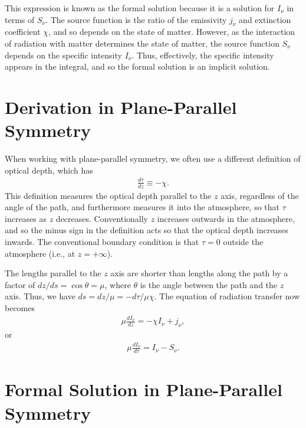 This expression is known as the formal solution because it is a solution
for $I_\nu$ in terms of $S_\nu$. The source function is the ratio of the
emissivity $j_\nu$ and extinction coefficient $\chi$, and so depends
on the state of matter. However, as the interaction of radiation with
matter determines the state of matter, the source function $S_\nu$
depends on the specific intensity $I_\nu$. Thus, effectively, the
specific intensity appears in the integral, and so the formal solution
is an implicit solution.

\newslide

\section{Derivation in Plane-Parallel Symmetry}

When working with plane-parallel symmetry, we often use a
different definition of optical depth, which has
\begin{align}
\frac{d\tau}{dz} \equiv - \chi.
\end{align}
This definition measures the optical depth parallel to the $z$ axis,
regardless of the angle of the path, and furthermore measures it into
the atmosphere, so that $\tau$ increases as $z$ decreases.
Conventionally $z$ increases outwards in the atmosphere, and so the
minus sign in the definition acts so that the optical depth increases
inwards. The conventional boundary condition is that $\tau = 0$
outside the atmosphere (i.e., at $z = +\infty$). 

The lengths parallel to the $z$ axis are shorter than lengths along the
path by a factor of $dz/ds = \cos\theta = \mu$, where $\theta$ is the angle
between the path and the $z$ axis. Thus, we have $ds = dz/\mu
= -d\tau / \mu \chi$.
The equation of radiation transfer now becomes
\begin{align}
\mu \frac{dI_\nu}{dz}
= - \chi I_\nu + j_\nu,
\end{align}
or
\begin{align}
\mu \frac{dI_\nu}{d\tau}
= I_\nu - S_\nu.
\end{align}

\newslide

\section{Formal Solution in Plane-Parallel Symmetry}

